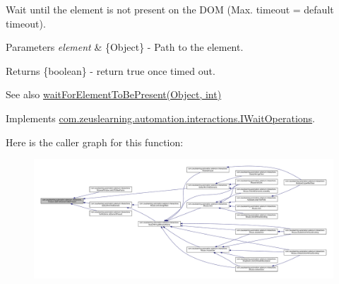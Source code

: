 Wait until the element is not present on the D\+OM (Max. timeout = default timeout).


\begin{DoxyParams}{Parameters}
{\em element} & \{Object\} -\/ Path to the element.\\
\hline
\end{DoxyParams}
\begin{DoxyReturn}{Returns}
\{boolean\} -\/ return {\ttfamily true} once timed out.
\end{DoxyReturn}
\begin{DoxySeeAlso}{See also}
\hyperlink{classcom_1_1zeuslearning_1_1automation_1_1selenium_1_1interactions_1_1Timeout_a42bc49d29d2f69d50650ec4c9d80eec2}{wait\+For\+Element\+To\+Be\+Present(\+Object, int)} 
\end{DoxySeeAlso}


Implements \hyperlink{interfacecom_1_1zeuslearning_1_1automation_1_1interactions_1_1IWaitOperations_a37e642af4e56132b564fa67e34e973d4}{com.\+zeuslearning.\+automation.\+interactions.\+I\+Wait\+Operations}.

Here is the caller graph for this function\+:
\nopagebreak
\begin{figure}[H]
\begin{center}
\leavevmode
\includegraphics[width=350pt]{d9/df4/classcom_1_1zeuslearning_1_1automation_1_1selenium_1_1interactions_1_1Timeout_a5b1fb9f2a2d0d61ec2b882269a3826d5_icgraph}
\end{center}
\end{figure}
\hypertarget{classcom_1_1zeuslearning_1_1automation_1_1selenium_1_1interactions_1_1Timeout_a42bc49d29d2f69d50650ec4c9d80eec2}{}\label{classcom_1_1zeuslearning_1_1automation_1_1selenium_1_1interactions_1_1Timeout_a42bc49d29d2f69d50650ec4c9d80eec2} 
